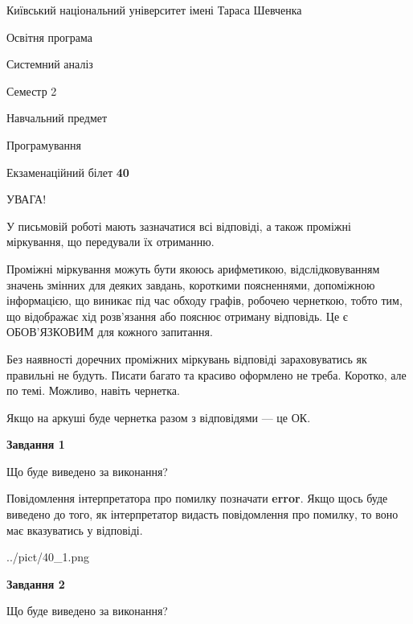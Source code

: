 \documentclass[12pt, ukrainian]{article}
\begin{document}
{{\begin {small}\par
{ \center  Київський національний університет імені Тараса Шевченка \par}
{\parbox {5 cm}{Освітня програма \hfill}{\parbox {7 cm}{Системний аналіз \hfill}}\parbox {6 cm}{\hfill Семестр 2}}\par
{\parbox {5 cm} {Навчальний предмет \hfill}\parbox {7 cm}{Програмування \hfill}\parbox {6cm}{\hfill}\par}\vspace{-7pt} \end{small}}{\center Екзаменаційний білет \No \textbf
{ 40 }\par}}
{
\begin {large}
УВАГА!

У письмовій роботі мають зазначатися всі відповіді, а також проміжні міркування, що передували їх отриманню.

Проміжні міркування можуть бути якоюсь арифметикою, відслідковуванням зна\-чень змінних для деяких завдань,
короткими поясненнями, допоміжною інформацією, що виникає під час обходу графів, робочею чернеткою,
тобто тим, що відображає хід розв’язання або пояснює отриману відповідь.
Це є ОБОВ’ЯЗКОВИМ для кожного запитання.

Без наявності доречних проміжних міркувань відповіді зараховуватись як правиль\-ні не будуть.
Писати багато та красиво оформлено не треба. Коротко, але по темі. Можли\-во, навіть чернетка.

Якщо на аркуші буде чернетка разом з відповідями --- це ОК.

\newpage

{\begin {center}\textbf{Завдання 1}\end {center}}\par
Що буде виведено за виконання?

Повідомлення інтерпретатора про помилку позначати \textbf{error}.
Якщо щось буде виведено до того, як інтерпретатор видасть повідомлення про помилку, 
то воно має вказуватись у відповіді. \par


\begin{center}
	{../pict/40_1.png}
\end{center}
\newpage

{\begin {center}\textbf{Завдання 2}\end {center}}\par
Що буде виведено за виконання?


\end{large}}
\end{document}
